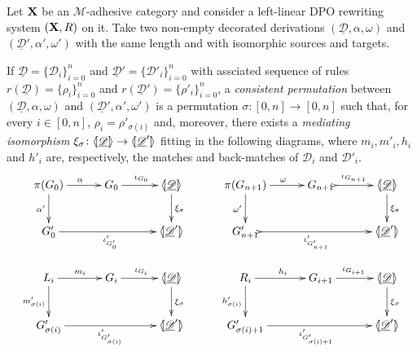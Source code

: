 \documentclass[a4paper,UKenglish,cleveref,pdftex, thm-restate,numberwithinsect]{lipics}
\def\R{\mathsf{R}}
\def\X{\textbf {\textup{X}}}
\newcommand{\dder}[1]{\mathscr{#1}}
\newcommand{\der}[1]{\underline{\dder{#1}}}
\newcommand{\lpro}{\langle \hspace{-1.85pt}[}
\newcommand{\rpro}{]\hspace{-1.85pt}\rangle}
\newcommand{\tpro}[1]{\lpro \der{#1}\rpro}
\begin{document}
\begin{definition}\label{def:permcon}
	Let $\X$ be an $\mathcal{M}$-adhesive category and consider a left-linear DPO rewriting system $(\X, \R)$ on it.  Take two non-empty decorated derivations $(\der{D}, \alpha, \omega)$ and  $(\der{D}', \alpha', \omega')$ with the same length and with isomorphic sources and targets.
	 	 
	 	If $\der{D}=\{\dder{D}_i\}_{i=0}^n$ and $\der{D}'=\{\dder{D}'_i\}_{i=0}^n$ with assciated sequence of rules $r(\der{D})=\{\rho_i\}_{i=0}^n$ and $r(\der{D}')=\{\rho'_i\}_{i=0}^n$, a \emph{consistent permutation} between  $(\der{D}, \alpha, \omega)$ and $(\der{D}', \alpha', \omega')$ is a permutation $\sigma\colon [0,n]\to [0,n]$  such that, for every $i\in [0,n]$, $\rho_i=\rho'_{\sigma(i)}$ and, moreover, there exists a \emph{mediating isomorphism} $\xi_\sigma\colon \tpro{D} \to \lpro \der{D}' \rpro$ fitting in the following diagrams, where $m_i, m'_i, h_i$ and $h'_i$ are, respectively, the matches and back-matches of $\dder{D}_i$ and $\dder{D}'_i$.
	\[\xymatrix@C=30pt{\pi(G_0)\ar[r]^{\alpha} \ar[d]_{\alpha'} & G_0 \ar[r]^{\iota_{G_0}} &\tpro{D} \ar[d]^{\xi_\sigma}&   \pi(G_{n+1}) \ar[r]^{\omega} \ar[d]_{\omega'} & G_{n+1} \ar@{>->}[r]^{\iota_{G_{n+1}}} &\tpro{D} \ar[d]^{\xi_\sigma}\\ G'_0 \ar[rr]_{\iota'_{G'_0}} & &\lpro \der{D}' \rpro& G'_{n+1} \ar@{>->}[rr]_{\iota'_{G'_{n+1}}} & &\lpro \der{D}' \rpro\\L_i \ar[r]^{m_i} \ar[d]_{m'_{\sigma(i)}}& G_i \ar[r]^{\iota_{G_i}} &\tpro{D} \ar[d]^{\xi_\sigma} & R_i \ar[r]^{h_i} \ar[d]_{h'_{\sigma(i)}}& G_{i+1} \ar[r]^{\iota_{G_{i+1}}} &\tpro{D} \ar[d]^{\xi_\sigma} \\G'_{\sigma(i)} \ar[rr]_{\iota'_{G'_{\sigma(i)}}}&& \lpro \der{D}' \rpro& G'_{\sigma(i)+1} \ar[rr]_{\iota'_{G'_{\sigma(i)+1}}}&& \lpro \der{D}' \rpro}\]
\end{definition}
\end{document}
